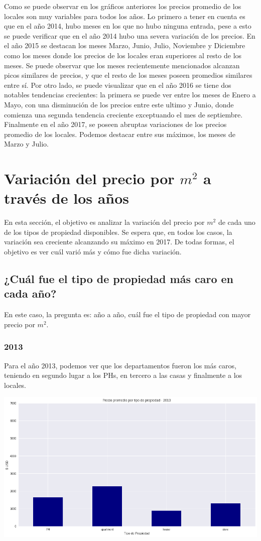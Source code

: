 \documentclass[a4paper, 10pt]{article}
\begin{document}
			Como se puede observar en los gráficos anteriores los precios promedio de los locales son muy variables para todos los años. Lo primero a tener en cuenta es que en el año 2014, hubo meses en los que no hubo ninguna entrada, pese a esto se puede verificar que en el año 2014 hubo una severa variación de los precios. En el año 2015 se destacan los meses Marzo, Junio, Julio, Noviembre y Diciembre como los meses donde los precios de los locales eran superiores al resto de los meses. Se puede observar que los meses recientemente mencionados alcanzan picos similares de precios, y que el resto de los meses poseen promedios similares entre sí. Por otro lado, se puede visualizar que en el año 2016 se tiene dos notables tendencias crecientes: la primera se puede ver entre los meses de Enero a Mayo, con una disminución de los precios entre este ultimo y Junio, donde comienza una segunda tendencia creciente exceptuando el mes de septiembre. Finalmente en el año 2017, se poseen abruptas variaciones de los precios promedio de los locales. Podemos destacar entre sus máximos, los meses de Marzo y Julio. 
		
		\section{Variación del precio por $m^2$ a través de los años}
			En esta sección, el objetivo es analizar la variación del precio por $m^2$ de cada uno de los tipos de propiedad
			disponibles. Se espera que, en todos los casos, la variación sea creciente alcanzando su máximo en 2017. De todas formas,
			el objetivo es ver cuál varió más y cómo fue dicha variación.
			\subsection{¿Cuál fue el tipo de propiedad más caro en cada año?}
				En este caso, la pregunta es: año a año, cuál fue el tipo de propiedad con mayor precio por $m^2$.
				\subsubsection{2013}
					Para el año 2013, podemos ver que los departamentos fueron los más caros, teniendo en segundo lugar a los
					PHs, en tercero a las casas y finalmente a los locales.
					\begin{center}
   		    				\includegraphics[width=\textwidth]{images/propPrice2013}
				  	\end{center}
\end{document}
